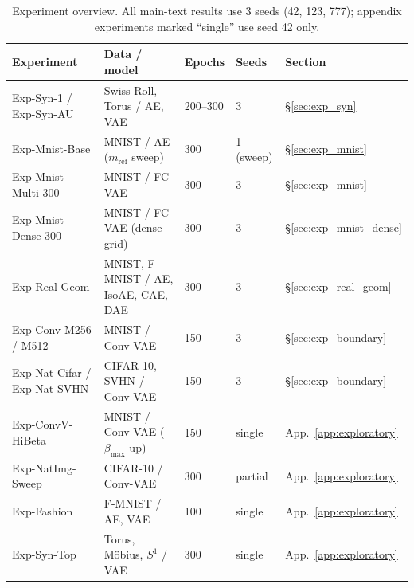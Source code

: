 \documentclass[11pt,a4paper]{jsarticle}
\begin{document}
\begin{table}[H]
\centering
\caption{Experiment overview. All main-text results use 3 seeds
(42, 123, 777); appendix experiments marked ``single'' use seed 42 only.}
\label{tab:exp_list}
\small
\begin{tabular}{p{3.4cm}p{3.4cm}p{2.2cm}p{1.6cm}p{2.2cm}}
\toprule
Experiment & Data / model & Epochs & Seeds & Section \\
\midrule
Exp-Syn-1 / Exp-Syn-AU & Swiss Roll, Torus / AE, VAE & 200--300 & 3 & §\ref{sec:exp_syn} \\
Exp-Mnist-Base & MNIST / AE ($m_{\mathrm{ref}}$ sweep) & 300 & 1 (sweep) & §\ref{sec:exp_mnist} \\
Exp-Mnist-Multi-300 & MNIST / FC-VAE & 300 & 3 & §\ref{sec:exp_mnist} \\
Exp-Mnist-Dense-300 & MNIST / FC-VAE (dense grid) & 300 & 3 & §\ref{sec:exp_mnist_dense} \\
Exp-Real-Geom & MNIST, F-MNIST / AE, IsoAE, CAE, DAE & 300 & 3 & §\ref{sec:exp_real_geom} \\
Exp-Conv-M256 / M512 & MNIST / Conv-VAE & 150 & 3 & §\ref{sec:exp_boundary} \\
Exp-Nat-Cifar / Exp-Nat-SVHN & CIFAR-10, SVHN / Conv-VAE & 150 & 3 & §\ref{sec:exp_boundary} \\
Exp-ConvV-HiBeta & MNIST / Conv-VAE ($\beta_{\max}$ up) & 150 & single & App.~\ref{app:exploratory} \\
Exp-NatImg-Sweep & CIFAR-10 / Conv-VAE & 300 & partial & App.~\ref{app:exploratory} \\
Exp-Fashion & F-MNIST / AE, VAE & 100 & single & App.~\ref{app:exploratory} \\
Exp-Syn-Top & Torus, M\"obius, $S^1$ / VAE & 300 & single & App.~\ref{app:exploratory} \\
\bottomrule
\end{tabular}
\end{table}
\end{document}
